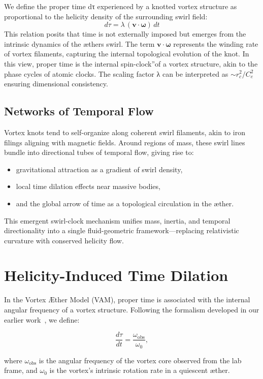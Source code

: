 We define the proper time dτ experienced by a knotted vortex structure as proportional to the helicity density of the surrounding swirl field:
$$ d\tau = \lambda \, (\mathbf{v} \cdot \boldsymbol{\omega}) \, dt $$
This relation posits that time is not externally imposed but emerges from the intrinsic dynamics of the æther\rqs s swirl. The term $\mathbf{v} \cdot \boldsymbol{\omega}$ represents the winding rate of vortex filaments, capturing the internal topological evolution of the knot. In this view, proper time is the internal \grqq spin-clock\textquotedblright of a vortex structure, akin to the phase cycles of atomic clocks. The scaling factor λ can be interpreted as $\sim r_c^2 / C_e^2$ ensuring dimensional consistency.

\subsection*{Networks of Temporal Flow}

Vortex knots tend to self-organize along coherent swirl filaments, akin to iron filings aligning with magnetic fields. Around regions of mass, these swirl lines bundle into directional tubes of temporal flow, giving rise to:
\begin{itemize}
    \item gravitational attraction as a gradient of swirl density,
    \item local time dilation effects near massive bodies,
    \item and the global arrow of time as a topological circulation in the æther.
\end{itemize}

This emergent swirl-clock mechanism unifies mass, inertia, and temporal directionality into a single fluid-geometric framework—replacing relativistic curvature with conserved helicity flow.

\section{Helicity-Induced Time Dilation}

In the Vortex Æther Model (VAM), proper time is associated with the internal angular frequency of a vortex structure. Following the formalism developed in our earlier work~\cite{iskandarani2025timedilation}, we define:

\[
\frac{d\tau}{dt} = \frac{\omega_{\text{obs}}}{\omega_0},
\]

where $\omega_{\text{obs}}$ is the angular frequency of the vortex core observed from the lab frame, and $\omega_0$ is the vortex's intrinsic rotation rate in a quiescent æther.

